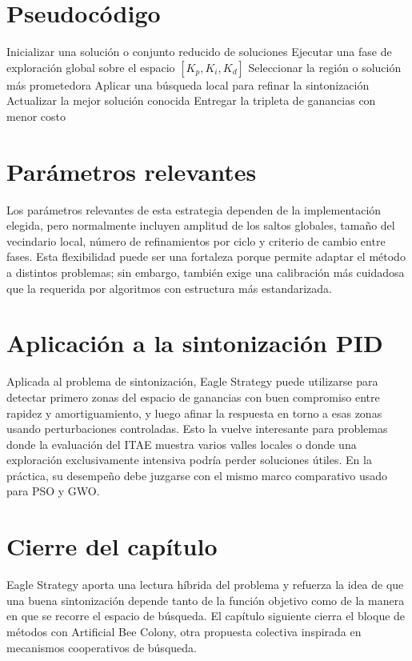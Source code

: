 \section{Pseudocódigo}
\begin{algorithm}[H]
\caption{Esquema general de Eagle Strategy para sintonización PID}
\begin{algorithmic}[1]
\State Inicializar una solución o conjunto reducido de soluciones
    \State Ejecutar una fase de exploración global sobre el espacio $\left[K_p,K_i,K_d\right]$
    \State Seleccionar la región o solución más prometedora
    \State Aplicar una búsqueda local para refinar la sintonización
    \State Actualizar la mejor solución conocida
\EndWhile
\State Entregar la tripleta de ganancias con menor costo
\end{algorithmic}
\end{algorithm}

\section{Parámetros relevantes}
Los parámetros relevantes de esta estrategia dependen de la implementación elegida, pero
normalmente incluyen amplitud de los saltos globales, tamaño del vecindario local, número de
refinamientos por ciclo y criterio de cambio entre fases. Esta flexibilidad puede ser una
fortaleza porque permite adaptar el método a distintos problemas; sin embargo, también exige
una calibración más cuidadosa que la requerida por algoritmos con estructura más estandarizada.

\section{Aplicación a la sintonización PID}
Aplicada al problema de sintonización, Eagle Strategy puede utilizarse para detectar primero
zonas del espacio de ganancias con buen compromiso entre rapidez y amortiguamiento, y luego
afinar la respuesta en torno a esas zonas usando perturbaciones controladas. Esto la vuelve
interesante para problemas donde la evaluación del ITAE muestra varios valles locales o donde
una exploración exclusivamente intensiva podría perder soluciones útiles. En la práctica, su
desempeño debe juzgarse con el mismo marco comparativo usado para PSO y GWO.

\section{Cierre del capítulo}
Eagle Strategy aporta una lectura híbrida del problema y refuerza la idea de que una buena
sintonización depende tanto de la función objetivo como de la manera en que se recorre el
espacio de búsqueda. El capítulo siguiente cierra el bloque de métodos con Artificial Bee
Colony, otra propuesta colectiva inspirada en mecanismos cooperativos de búsqueda.
